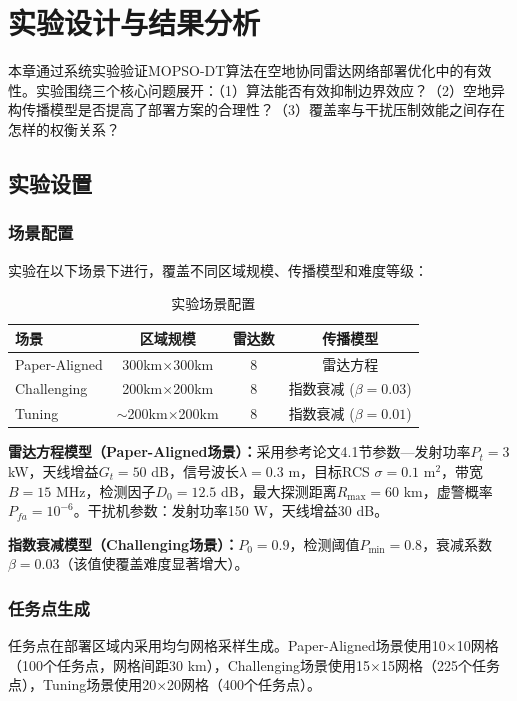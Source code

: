 \section{实验设计与结果分析}
\label{sec:experiments}

本章通过系统实验验证MOPSO-DT算法在空地协同雷达网络部署优化中的有效性。实验围绕三个核心问题展开：（1）算法能否有效抑制边界效应？（2）空地异构传播模型是否提高了部署方案的合理性？（3）覆盖率与干扰压制效能之间存在怎样的权衡关系？

\subsection{实验设置}

\subsubsection{场景配置}

实验在以下场景下进行，覆盖不同区域规模、传播模型和难度等级：

\begin{table}[t]
\centering
\caption{实验场景配置}
\label{tab:scenarios}
\begin{tabular}{lccc}
\toprule
场景 & 区域规模 & 雷达数 & 传播模型 \\
\midrule
Paper-Aligned & 300km$\times$300km & 8 & 雷达方程 \\
Challenging & 200km$\times$200km & 8 & 指数衰减 ($\beta=0.03$) \\
Tuning & $\sim$200km$\times$200km & 8 & 指数衰减 ($\beta=0.01$) \\
\bottomrule
\end{tabular}
\end{table}

\textbf{雷达方程模型（Paper-Aligned场景）：}采用参考论文4.1节参数---发射功率$P_t = 3$ kW，天线增益$G_t = 50$ dB，信号波长$\lambda = 0.3$ m，目标RCS $\sigma = 0.1$ m$^2$，带宽$B = 15$ MHz，检测因子$D_0 = 12.5$ dB，最大探测距离$R_{\max} = 60$ km，虚警概率$P_{fa} = 10^{-6}$。干扰机参数：发射功率150 W，天线增益30 dB。

\textbf{指数衰减模型（Challenging场景）：}$P_0 = 0.9$，检测阈值$P_{\min} = 0.8$，衰减系数$\beta = 0.03$（该值使覆盖难度显著增大）。

\subsubsection{任务点生成}

任务点在部署区域内采用均匀网格采样生成。Paper-Aligned场景使用10$\times$10网格（100个任务点，网格间距30 km），Challenging场景使用15$\times$15网格（225个任务点），Tuning场景使用20$\times$20网格（400个任务点）。

